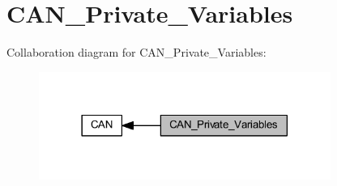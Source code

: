 \hypertarget{group___c_a_n___private___variables}{}\section{C\+A\+N\+\_\+\+Private\+\_\+\+Variables}
\label{group___c_a_n___private___variables}
Collaboration diagram for C\+A\+N\+\_\+\+Private\+\_\+\+Variables\+:
\nopagebreak
\begin{figure}[H]
\begin{center}
\leavevmode
\includegraphics[width=270pt]{group___c_a_n___private___variables}
\end{center}
\end{figure}
